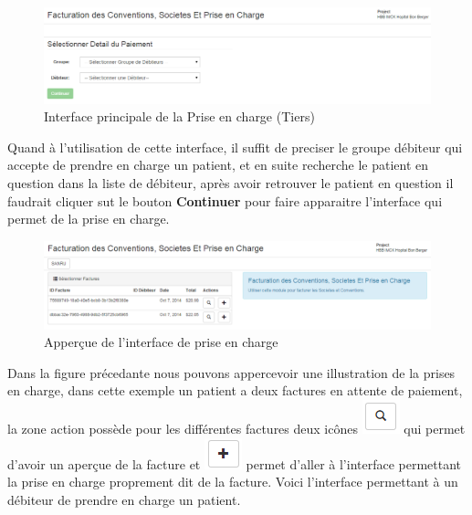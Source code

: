 \documentclass[12pt,a4paper]{report}
\begin{document}
\begin{figure}[h]
\begin{center}
\includegraphics[width=14cm]{pic/FacturationConv.png}
\end{center}
\caption{Interface principale de la Prise en charge (Tiers)}
\label{Interface principale de la Prise en charge (Tiers)}
\end{figure}

Quand à l'utilisation de cette interface, il suffit de preciser le groupe débiteur qui accepte de prendre en charge un patient, et en suite recherche le patient en question dans la liste de débiteur, après avoir retrouver le patient en question il faudrait cliquer sut le bouton  \textbf{Continuer} pour faire apparaitre l'interface qui permet de la prise en charge.

\begin{figure}[h]
\begin{center}
\includegraphics[width=14cm]{pic/FactPrCharge.png}
\end{center}
\caption{Apperçue de l'interface de prise en charge}
\label{Apperçue de l'interface de prise en charge}
\end{figure}

Dans la figure précedante nous pouvons appercevoir une illustration de la prises en charge, dans cette exemple un patient a deux factures en attente de paiement, la zone action possède pour les différentes factures deux icônes \includegraphics[scale=0.7]{pic/LoopBlack.png} qui permet d'avoir un aperçue de la facture et \includegraphics[scale=0.7]{pic/plusBlack.png} permet d'aller à l'interface permettant la prise en charge proprement dit de la facture. 
Voici l'interface permettant à un débiteur de prendre en charge un patient.
\end{document}
